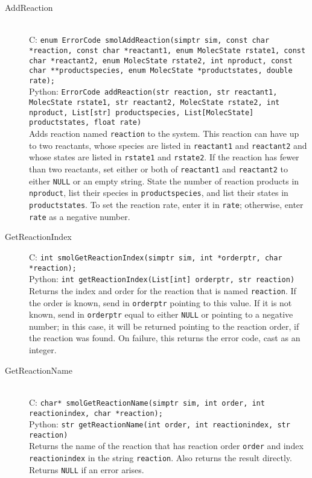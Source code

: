 \documentclass {book}
\begin{document}
\begin{description}

\item[AddReaction]
\hfill \\
C: \texttt{enum ErrorCode smolAddReaction(simptr sim, const char *reaction, const char *reactant1, enum MolecState rstate1, const char *reactant2, enum MolecState rstate2, int nproduct, const char **productspecies, enum MolecState *productstates, double rate);}\\
Python: \texttt{ErrorCode addReaction(str reaction, str reactant1, MolecState rstate1, str reactant2, MolecState rstate2, int nproduct, List[str] productspecies, List[MolecState] productstates, float rate)}\\
Adds reaction named \texttt{reaction} to the system. This reaction can have up to two reactants, whose species are listed in \texttt{reactant1} and \texttt{reactant2} and whose states are listed in \texttt{rstate1} and \texttt{rstate2}. If the reaction has fewer than two reactants, set either or both of \texttt{reactant1} and \texttt{reactant2} to either \texttt{NULL} or an empty string. State the number of reaction products in \texttt{nproduct}, list their species in \texttt{productspecies}, and list their states in \texttt{productstates}. To set the reaction rate, enter it in \texttt{rate}; otherwise, enter \texttt{rate} as a negative number.

\item[GetReactionIndex]
C: \texttt{int smolGetReactionIndex(simptr sim, int *orderptr, char *reaction);}\\
Python: \texttt{int getReactionIndex(List[int] orderptr, str reaction)}\\
Returns the index and order for the reaction that is named \texttt{reaction}. If the order is known, send in \texttt{orderptr} pointing to this value. If it is not known, send in \texttt{orderptr} equal to either \texttt{NULL} or pointing to a negative number; in this case, it will be returned pointing to the reaction order, if the reaction was found. On failure, this returns the error code, cast as an integer.

\item[GetReactionName]
\hfill \\
C: \texttt{char* smolGetReactionName(simptr sim, int order, int reactionindex, char *reaction);}\\
Python: \texttt{str getReactionName(int order, int reactionindex, str reaction)}\\
Returns the name of the reaction that has reaction order \texttt{order} and index \texttt{reactionindex} in the string \texttt{reaction}. Also returns the result directly. Returns \texttt{NULL} if an error arises.


\end{description}
\end{document}
